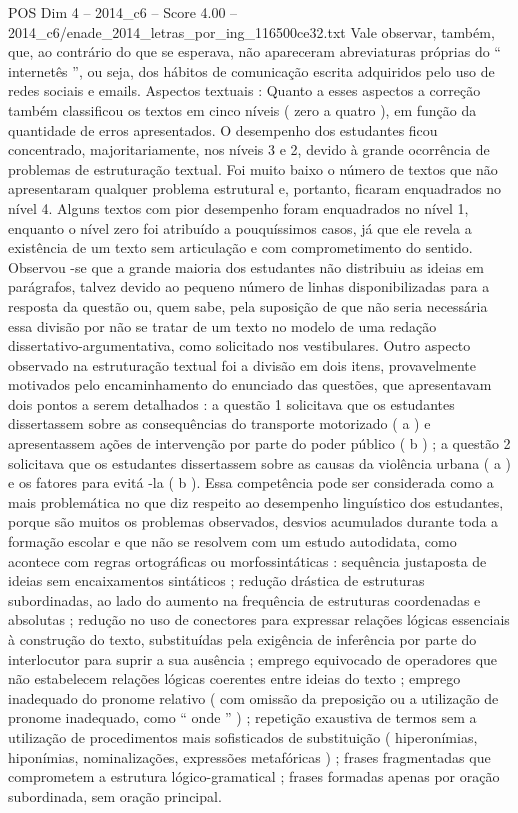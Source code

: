 \begin{textsample}{POS Dim 4 – 2014\_c6 – Score 4.00 – 2014\_c6/enade\_2014\_letras\_por\_ing\_116500ce32.txt}
Vale observar, também, que, ao contrário do que se esperava, não apareceram abreviaturas próprias do “ internetês ”, ou seja, dos hábitos de comunicação escrita adquiridos pelo uso de redes sociais e emails.
Aspectos textuais : Quanto a esses aspectos a correção também classificou os textos em cinco níveis ( zero a quatro ), em função da quantidade de erros apresentados.
O desempenho dos estudantes ficou concentrado, majoritariamente, nos níveis 3 e 2, devido à grande ocorrência de problemas de estruturação textual.
Foi muito baixo o número de textos que não apresentaram qualquer problema estrutural e, portanto, ficaram enquadrados no nível 4.
Alguns textos com pior desempenho foram enquadrados no nível 1, enquanto o nível zero foi atribuído a pouquíssimos casos, já que ele revela a existência de um texto sem articulação e com comprometimento do sentido.
Observou -se que a grande maioria dos estudantes não distribuiu as ideias em parágrafos, talvez devido ao pequeno número de linhas disponibilizadas para a resposta da questão ou, quem sabe, pela suposição de que não seria necessária essa divisão por não se tratar de um texto no modelo de uma redação dissertativo-argumentativa, como solicitado nos vestibulares.
Outro aspecto observado na estruturação textual foi a divisão em dois itens, provavelmente motivados pelo encaminhamento do enunciado das questões, que apresentavam dois pontos a serem detalhados : a questão 1 solicitava que os estudantes dissertassem sobre as consequências do transporte motorizado ( a ) e apresentassem ações de intervenção por parte do poder público ( b ) ; a questão 2 solicitava que os estudantes dissertassem sobre as causas da violência urbana ( a ) e os fatores para evitá -la ( b ).
Essa competência pode ser considerada como a mais problemática no que diz respeito ao desempenho linguístico dos estudantes, porque são muitos os problemas observados, desvios acumulados durante toda a formação escolar e que não se resolvem com um estudo autodidata, como acontece com regras ortográficas ou morfossintáticas : sequência justaposta de ideias sem encaixamentos sintáticos ; redução drástica de estruturas subordinadas, ao lado do aumento na frequência de estruturas coordenadas e absolutas ; redução no uso de conectores para expressar relações lógicas essenciais à construção do texto, substituídas pela exigência de inferência por parte do interlocutor para suprir a sua ausência ; emprego equivocado de operadores que não estabelecem relações lógicas coerentes entre ideias do texto ; emprego inadequado do pronome relativo ( com omissão da preposição ou a utilização de pronome inadequado, como “ onde ” ) ; repetição exaustiva de termos sem a utilização de procedimentos mais sofisticados de substituição ( hiperonímias, hiponímias, nominalizações, expressões metafóricas ) ; frases fragmentadas que comprometem a estrutura lógico-gramatical ; frases formadas apenas por oração subordinada, sem oração principal.

\end{textsample}
